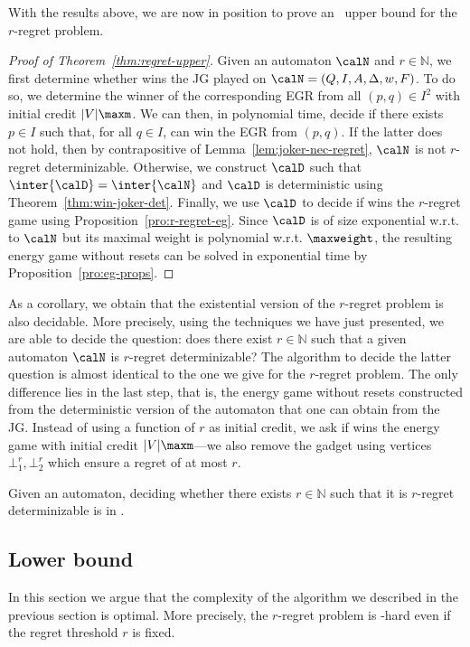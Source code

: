 \documentclass[a4paper]{article}
\begin{document}
With the results above, we are now in position to prove an
\EXP~upper bound for the $r$-regret problem.
\begin{proof}[Proof of Theorem~\ref{thm:regret-upper}]
	Given an automaton $\calN$ and $r \in \mathbb{N}$, we first determine
	whether \eve wins the JG played on $\calN = (Q,I,A,\Delta,w,F)$.
	To do so, we determine the winner of the corresponding EGR from all
	$(p,q) \in I^2$ with initial credit $|V|\maxm$. We can then, in
	polynomial time, decide if there exists $p \in I$ such that, for all $q
	\in I$, \eve can win the EGR from $(p,q)$. If the latter does not hold,
	then by contrapositive of Lemma~\ref{lem:joker-nec-regret}, $\calN$ is
	not $r$-regret determinizable. Otherwise, we construct $\calD$ such that
	$\inter{\calD} = \inter{\calN}$ and $\calD$ is deterministic using
	Theorem~\ref{thm:win-joker-det}. Finally, we use $\calD$ to decide if
	\eve wins the $r$-regret game using Proposition~\ref{pro:r-regret-eg}.
	Since $\calD$ is of size exponential w.r.t. to $\calN$ but its maximal
	weight is polynomial w.r.t. $\maxweight$, the resulting energy game
	without resets can be solved in exponential time by
	Proposition~\ref{pro:eg-props}.
\end{proof}

As a corollary, we obtain that the existential version of the $r$-regret problem
is also decidable. More precisely, using the techniques we have just presented,
we are able to decide the question: does there exist $r \in \mathbb{N}$ such
that a given automaton $\calN$ is $r$-regret determinizable? The algorithm to
decide the latter question is almost identical to the one we give for the
$r$-regret problem. The only difference lies in the last step, that is, the
energy game without resets constructed from the deterministic version of the
automaton that one can obtain from the JG. Instead of using a function of $r$ as
initial credit, we ask if \eve wins the energy game with initial credit
$|V|\maxm$---we also remove the gadget using vertices
$\bot^r_1,\bot^r_2$ which ensure a regret of at most $r$.
\begin{theorem}\label{thm:existential-regret-prob}
	Given an automaton, 
	deciding whether there exists $r \in \mathbb{N}$ such that it
	is $r$-regret determinizable is in \EXP.
\end{theorem}

\subsection{Lower bound}
In this section we argue that the complexity of the algorithm we described in
the previous section is optimal. More precisely, the $r$-regret problem
is \EXP-hard even if the regret threshold $r$ is fixed.
\end{document}
